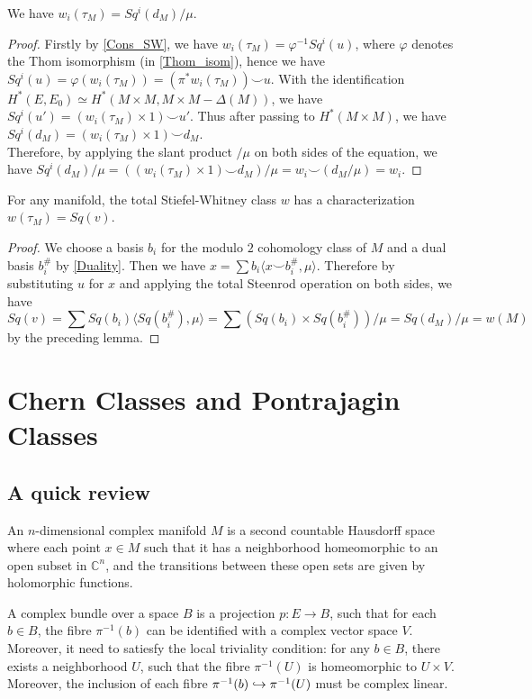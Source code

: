 	\begin{lemma}
		We have $w_i(\tau_M)=Sq^i(d_M)/\mu$. 
	\end{lemma}
	\begin{proof}
		Firstly by \cref{Cons_SW}, we have $w_i(\tau_M)=\varphi^{-1}Sq^i(u)$, where $\varphi$ denotes the Thom isomorphism (in \cref{Thom_isom}), hence we have $Sq^i(u)=\varphi(w_i(\tau_M))=(\pi^*w_i(\tau_M))\smile u$. With the identification $H^*(E,E_0)\simeq H^*(M\times M,M\times M-\Delta(M))$, we have $Sq^i(u')=(w_i(\tau_M)\times 1)\smile u'$. Thus after passing to $H^*(M\times M)$, we have $Sq^i(d_M)=(w_i(\tau_M)\times 1)\smile d_M$. \\
		Therefore, by applying the slant product $/\mu$ on both sides of the equation, we have $Sq^i(d_M)/\mu=((w_i(\tau_M)\times 1)\smile d_M)/\mu=w_i\smile(d_M/\mu)=w_i$. 
	\end{proof}
	\begin{thm}
		For any manifold, the total Stiefel-Whitney class $w$ has a characterization $w(\tau_M)=Sq(v)$. 
	\end{thm}
	\begin{proof}
		We choose a basis $b_i$ for the modulo $2$ cohomology class of $M$ and a dual basis $b_i^\#$ by \cref{Duality}. Then we have $x=\sum b_i\langle x\smile b_i^\#,\mu\rangle$. Therefore by substituting $u$ for $x$ and applying the total Steenrod operation on both sides, we have
		\[ Sq(v)=\sum Sq(b_i)\langle Sq(b_i^\#),\mu\rangle=\sum(Sq(b_i)\times Sq(b_i^\#))/\mu=Sq(d_M)/\mu=w(M) \]
		by the preceding lemma. 
	\end{proof}


\chapter{Chern Classes and Pontrajagin Classes}

\section{A quick review}

	\begin{defn}
		An $n$-dimensional complex manifold $M$ is a second countable Hausdorff space where each point $x\in M$ such that it has a neighborhood homeomorphic to an open subset in $\mathbb{C}^n$, and the transitions between these open sets are given by holomorphic functions. 
	\end{defn}

	\begin{defn}
		A complex bundle over a space $B$ is a projection $p:E\to B$, such that for each $b\in B$, the fibre $\pi^{-1}(b)$ can be identified with a complex vector space $V$. Moreover, it need to satiesfy the local triviality condition: for any $b\in B$, there exists a neighborhood $U$, such that the fibre $\pi^{-1}(U)$ is homeomorphic to $U\times V$. Moreover, the inclusion of each fibre $\pi^{-1}(b)\hookrightarrow\pi^{-1}(U)$ must be complex linear. 
	\end{defn}

